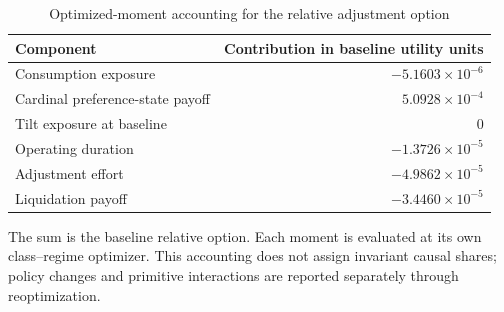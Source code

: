 \begin{table}[htbp]
\centering
\caption{Optimized-moment accounting for the relative adjustment option}\label{tab:r8_features}
\small
\begin{tabular}{lr}
\toprule
Component & Contribution in baseline utility units \\
\midrule
Consumption exposure & $-5.1603\times10^{-6}$ \\
Cardinal preference-state payoff & $5.0928\times10^{-4}$ \\
Tilt exposure at baseline & $0$ \\
Operating duration & $-1.3726\times10^{-5}$ \\
Adjustment effort & $-4.9862\times10^{-5}$ \\
Liquidation payoff & $-3.4460\times10^{-5}$ \\
\bottomrule
\end{tabular}
\par\vspace{3pt}\begin{minipage}{0.96\textwidth}\footnotesize The sum is the baseline relative option. Each moment is evaluated at its own class--regime optimizer. This accounting does not assign invariant causal shares; policy changes and primitive interactions are reported separately through reoptimization.\end{minipage}
\end{table}
